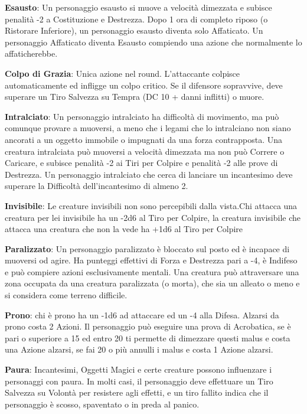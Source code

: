 \documentclass[a4paper,12 pt,openany]{book}
\begin{document}
\begin{textblock*}{19 cm}
\begin{multicols}{2}
\textbf{Esausto}: Un personaggio esausto si muove a velocità dimezzata e subisce penalità -2 a Costituzione e Destrezza. Dopo 1 ora di completo riposo (o Ristorare Inferiore), un personaggio esausto diventa solo Affaticato. Un personaggio Affaticato diventa Esausto compiendo una azione che normalmente lo affaticherebbe.
			
\textbf{Colpo di Grazia}: Unica azione nel round. L'attaccante colpisce automaticamente ed infligge un colpo critico. Se il difensore sopravvive, deve superare un Tiro Salvezza su Tempra (DC 10 + danni inflitti) o muore.
			
\textbf{Intralciato}: Un personaggio intralciato ha difficoltà di movimento, ma può comunque provare a muoversi, a meno che i legami che lo intralciano non siano ancorati a un oggetto immobile o impugnati da una forza contrapposta.
Una creatura intralciata può muoversi a velocità dimezzata ma non può Correre o Caricare, e subisce penalità -2 ai Tiri per Colpire e penalità -2 alle prove di Destrezza.
Un personaggio intralciato che cerca di lanciare un incantesimo deve superare la Difficoltà dell'incantesimo di almeno 2.
			
\textbf{Invisibile}: Le creature invisibili non sono percepibili dalla vista.Chi attacca una creatura per lei invisibile ha un -2d6 al Tiro per Colpire, la creatura invisibile che attacca una creatura che non la vede ha +1d6 al Tiro per Colpire
			
\textbf{Paralizzato}: Un personaggio paralizzato è bloccato sul posto ed è incapace di muoversi od agire. Ha punteggi effettivi di Forza e Destrezza pari a -4, è Indifeso e può compiere azioni esclusivamente mentali.
Una creatura può attraversare una zona occupata da una creatura paralizzata (o morta), che sia un alleato o meno e si considera come terreno difficile.
			
\textbf{Prono}: chi è prono ha un -1d6 ad attaccare ed un -4 alla Difesa. Alzarsi da prono costa 2 Azioni.
Il personaggio può eseguire una prova di Acrobatica, se è pari o superiore a 15 ed entro 20 ti permette di dimezzare questi malus e costa una Azione alzarsi, se fai 20 o più annulli i malus e costa 1 Azione alzarsi.
			
\textbf{Paura}: Incantesimi, Oggetti Magici e certe creature possono influenzare i personaggi con paura. In molti casi, il personaggio deve effettuare un Tiro Salvezza su Volontà per resistere agli effetti, e un tiro fallito indica che il personaggio è scosso, spaventato o in preda al panico.
			

\end{multicols}
\end{textblock*}
\end{document}
